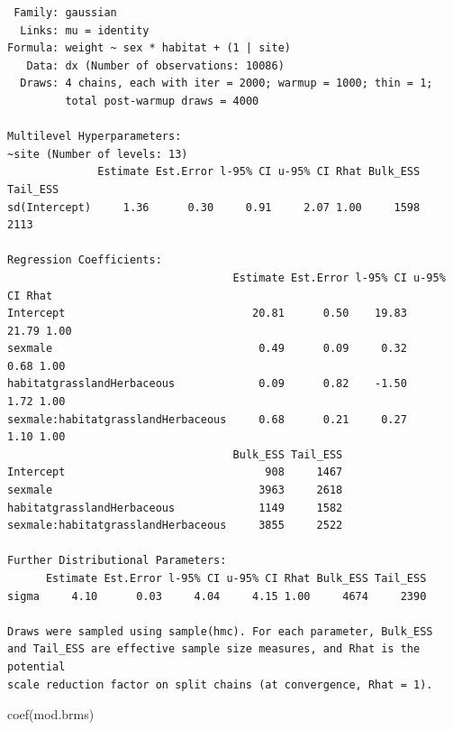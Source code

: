 \documentclass[
  13,
  letterpaper,
]{report}
\newenvironment{Shaded}{\begin{snugshade}}{\end{snugshade}}
\newcommand{\FunctionTok}[1]{\textcolor[rgb]{0.28,0.35,0.67}{#1}}
\newcommand{\NormalTok}[1]{\textcolor[rgb]{0.00,0.23,0.31}{#1}}
\begin{document}
\begin{verbatim}
 Family: gaussian 
  Links: mu = identity 
Formula: weight ~ sex * habitat + (1 | site) 
   Data: dx (Number of observations: 10086) 
  Draws: 4 chains, each with iter = 2000; warmup = 1000; thin = 1;
         total post-warmup draws = 4000

Multilevel Hyperparameters:
~site (Number of levels: 13) 
              Estimate Est.Error l-95% CI u-95% CI Rhat Bulk_ESS Tail_ESS
sd(Intercept)     1.36      0.30     0.91     2.07 1.00     1598     2113

Regression Coefficients:
                                   Estimate Est.Error l-95% CI u-95% CI Rhat
Intercept                             20.81      0.50    19.83    21.79 1.00
sexmale                                0.49      0.09     0.32     0.68 1.00
habitatgrasslandHerbaceous             0.09      0.82    -1.50     1.72 1.00
sexmale:habitatgrasslandHerbaceous     0.68      0.21     0.27     1.10 1.00
                                   Bulk_ESS Tail_ESS
Intercept                               908     1467
sexmale                                3963     2618
habitatgrasslandHerbaceous             1149     1582
sexmale:habitatgrasslandHerbaceous     3855     2522

Further Distributional Parameters:
      Estimate Est.Error l-95% CI u-95% CI Rhat Bulk_ESS Tail_ESS
sigma     4.10      0.03     4.04     4.15 1.00     4674     2390

Draws were sampled using sample(hmc). For each parameter, Bulk_ESS
and Tail_ESS are effective sample size measures, and Rhat is the potential
scale reduction factor on split chains (at convergence, Rhat = 1).
\end{verbatim}

\begin{Shaded}
\begin{Highlighting}[]
\FunctionTok{coef}\NormalTok{(mod.brms)}
\end{Highlighting}
\end{Shaded}
\end{document}
